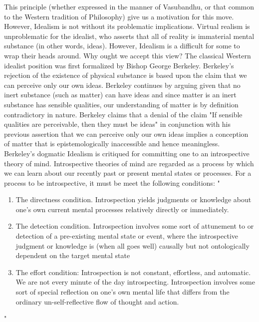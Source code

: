 This principle (whether expressed in the manner of Vasubandhu, or that common to the Western tradition of Philosophy) give us a motivation for this move. However, Idealism is not without its problematic implications. Virtual realism is unproblematic for the idealist, who asserts that all of reality is immaterial mental substance (in other words, ideas). However, Idealism is a difficult for some to wrap their heads around. Why ought we accept this view? The classical Western idealist position was first formalized by Bishop George Berkeley. Berkeley's rejection of the existence of physical substance is based upon the claim that we can perceive only our own ideas. Berkeley continues by arguing given that no inert substance (such as matter) can have ideas and since \textbf{\textit{}}matter is an inert substance has sensible qualities, our understanding of matter is by definition contradictory in nature. Berkeley claims that a denial of the claim "If sensible qualities are perceivable, then they must be ideas" in conjunction with his previous assertion that we can perceive only our own ideas implies a conception of matter that is epistemologically inaccessible and hence meaningless. \cite{berkeley2003a}
\\
Berkeley's dogmatic Idealism is critiqued for committing one to an introspective theory of mind. \cite{thomson2012bacon} Introspective theories of mind are regarded as a process by which we can learn about our recently past or present mental states or processes. For a process to be introspective, it must be meet the following conditions: "
\begin{enumerate}
	\item The directness condition.  Introspection yields judgments or knowledge about one's own current mental processes relatively directly or immediately. 
	\item The detection condition. Introspection involves some sort of attunement to or detection of a pre-existing mental state or event, where the introspective judgment or knowledge is (when all goes well) causally but not ontologically dependent on the target mental state
	\item The effort condition: Introspection is not constant, effortless, and automatic. We are not every minute of the day introspecting. Introspection involves some sort of special reflection on one's own mental life that differs from the ordinary un-self-reflective flow of thought and action. 
\end{enumerate}
"\cite{sep-introspection} \newline

